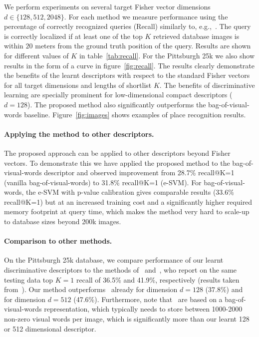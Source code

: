 \documentclass[10pt,twocolumn,letterpaper]{article}
\begin{document}
      We perform experiments on several target Fisher vector dimensions $d\in\{128,512,2048\}$. For each method we measure performance using the percentage of correctly recognized queries (Recall) similarly to, e.g.,~\cite{Chen11,Knopp2010,Sattler-BMVC12}. The query is correctly localized if at least one of the top $K$ retrieved database images is within $20$ meters from the ground truth position of the query. Results are shown for different values of $K$ in table~\ref{tab:recall}. For the Pittsburgh 25k we also show results in the form of a curve in figure~\ref{fig:recall}. The results clearly demonstrate the benefits of the learnt descriptors with respect to the standard Fisher vectors for all target dimensions and lengths of shortlist $K$. The benefits of discriminative learning are specially prominent for low-dimensional compact descriptors ($d=128$). 
      The proposed method also significantly outperforms the bag-of-visual-words baseline. Figure~\ref{fig:images} shows examples of place recognition results. 

      \paragraph{Applying the method to other descriptors.}
        \textcolor{petr}{ 
          The proposed approach can be applied to other descriptors beyond Fisher vectors. To demonstrate this we have applied the proposed method to the bag-of-visual-words descriptor and observed improvement from 28.7\% recall@K=1 (vanilla bag-of-visual-words) to 31.8\% recall@K=1 (e-SVM). For bag-of-visual-words, the e-SVM with p-value calibration gives comparable results (33.6\% recall@K=1) but at an increased training cost and a significantly higher required memory footprint at query time, which makes the method very hard to scale-up to database sizes beyond 200k images.
        }

      \paragraph{Comparison to other methods.}
         On the Pittsburgh 25k database, we compare performance of our learnt discriminative descriptors to the methods of~\cite{Gronat13} and~\cite{Knopp2010}, who report on the same testing data top $K=1$ recall of 36.5\% and 41.9\%, respectively (results taken from~\cite{Gronat13}). Our method outperforms~\cite{Knopp2010} already for dimension $d=128$ (37.8\%) and~\cite{Gronat13} for dimension $d=512$ (47.6\%). Furthermore, note that~\cite{Gronat13,Knopp2010} are based on a bag-of-visual-words representation, which typically needs to store between 1000-2000 non-zero visual words per image, which is significantly more than our learnt 128 or 512 dimensional descriptor. 
\end{document}
